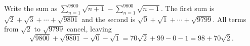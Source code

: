 Write the sum as $\displaystyle\sum_{n=1}^{9800}\sqrt{n+1}-\sum_{n=1}^{9800}\sqrt{n-1}$. The first sum is $\sqrt2+\sqrt3+\cdots+\sqrt{9801}$ and the second is $\sqrt0+\sqrt1+\cdots+\sqrt{9799}$. All terms from $\sqrt2$ to $\sqrt{9799}$ cancel, leaving
\[
\sqrt{9800}+\sqrt{9801}-\sqrt0-\sqrt1=70\sqrt2+99-0-1=\boxed{98+70\sqrt2} .
\]
